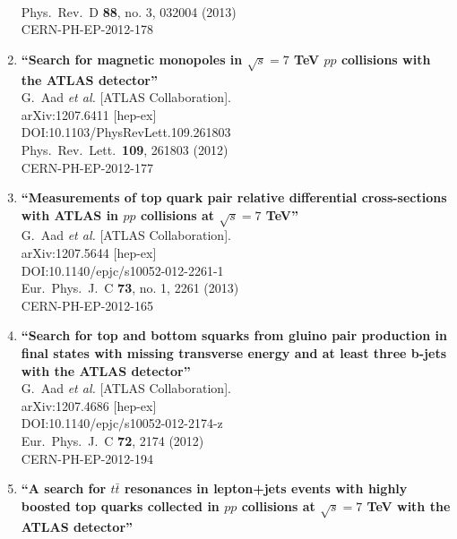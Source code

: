 \documentclass{article}
\begin{document}
\begin{enumerate}
  \\{}Phys.\ Rev.\ D {\bf 88}, no. 3, 032004 (2013)
  \\{}CERN-PH-EP-2012-178
\item%
{\bf ``Search for magnetic monopoles in $\sqrt{s}=7$ TeV $pp$ collisions with the ATLAS detector''}
  \\{}G.~Aad {\it et al.} [ATLAS Collaboration].
  \\{}arXiv:1207.6411 [hep-ex]
  \\{}DOI:10.1103/PhysRevLett.109.261803
  \\{}Phys.\ Rev.\ Lett.\  {\bf 109}, 261803 (2012)
  \\{}CERN-PH-EP-2012-177
\item%
{\bf ``Measurements of top quark pair relative differential cross-sections with ATLAS in $pp$ collisions at $\sqrt{s}=7$ TeV''}
  \\{}G.~Aad {\it et al.} [ATLAS Collaboration].
  \\{}arXiv:1207.5644 [hep-ex]
  \\{}DOI:10.1140/epjc/s10052-012-2261-1
  \\{}Eur.\ Phys.\ J.\ C {\bf 73}, no. 1, 2261 (2013)
  \\{}CERN-PH-EP-2012-165
\item%
{\bf ``Search for top and bottom squarks from gluino pair production in final states with missing transverse energy and at least three b-jets with the ATLAS detector''}
  \\{}G.~Aad {\it et al.} [ATLAS Collaboration].
  \\{}arXiv:1207.4686 [hep-ex]
  \\{}DOI:10.1140/epjc/s10052-012-2174-z
  \\{}Eur.\ Phys.\ J.\ C {\bf 72}, 2174 (2012)
  \\{}CERN-PH-EP-2012-194
\item%
{\bf ``A search for $t\bar{t}$ resonances in lepton+jets events with highly boosted top quarks collected in $pp$ collisions at $\sqrt{s} = 7$ TeV with the ATLAS detector''}

\end{enumerate}
\end{document}

